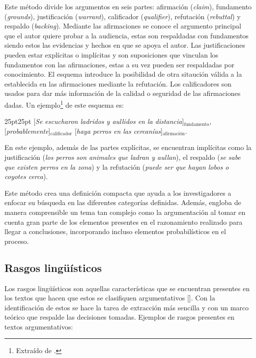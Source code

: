 Este método divide los argumentos en seis partes: afirmación 
(\emph{claim}), fundamento (\emph{grounds}), justificación (\emph{warrant}), calificador 
(\emph{qualifier}), refutación (\emph{rebuttal}) y respaldo (\emph{backing}).
Mediante las afirmaciones se conoce el argumento principal que el autor quiere probar a la audiencia,
estas son respaldadas con fundamentos siendo estos las evidencias y hechos en que se apoya el autor.
Las justificaciones pueden estar explícitas o implícitas y son suposiciones que vinculan los
fundamentos con las afirmaciones, estas a su vez pueden ser respaldadas por conocimiento.
El esquema introduce la posibilidad de otra sitaución válida a la establecida en las afirmaciones
mediante la refutación. Los calificadores son usados para dar más información de la calidad o seguridad
de las afirmaciones dadas. Un ejemplo\footnote{Extraído de 
\cite{toulminArgument}.
} de este esquema es:

\begin{adjustwidth}{25pt}{25pt}
    [\emph{Se escucharon ladridos y aullidos en la distancia}]$_{\mathrm{fundamento}}$, 
    [\emph{probablemente}]$_{\mathrm{calificador}}$ 
    [\emph{haya perros en las cercanías}]$_{\mathrm{afirmación}}$.
\end{adjustwidth}

En este ejemplo, además de las partes explícitas, se encuentran implícitas como la justificación 
(\emph{los perros son animales que ladran y aullan}), el respaldo (\emph{se sabe que existen perros en la zona}) y 
la refutación (\emph{puede ser que hayan lobos o coyotes cerca}).

Este método crea una definición compacta que ayuda a los investigadores a enfocar su búsqueda 
en las diferentes categorías definidas. Además, engloba de manera comprensible un tema tan complejo 
como la argumentación al tomar en cuenta gran parte de los elementos presentes en el razonamiento
realizado para llegar a conclusiones, incorporando incluso elementos probabilísticos en el proceso. 

\subsection{Rasgos lingüísticos}

Los rasgos lingüísticos son aquellas características que se encuentran presentes en los textos 
que hacen que estos se clasifiquen argumentativos [\cite{venegas2005hacia}]. Con 
la identificación de estos se hace la tarea de extracción más sencilla y con un marco teórico 
que respalde las decisiones tomadas. Ejemplos de rasgos presentes en textos argumentativos:


